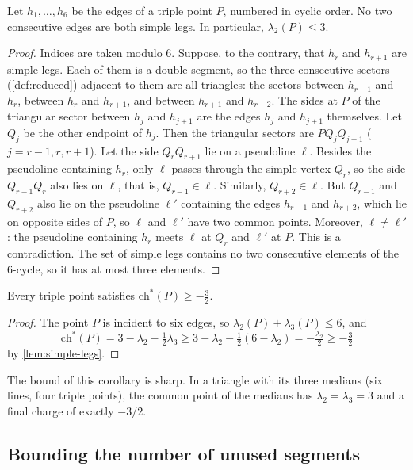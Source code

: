 \begin{lemma}\label{lem:simple-legs}
Let $h_1,\dots,h_6$ be the edges of a triple point $P$, numbered in cyclic order. No two consecutive edges are both simple legs. In particular, $\lambda_2(P)\le3$.
\end{lemma}

\begin{proof}
Indices are taken modulo 6.
Suppose, to the contrary, that $h_r$ and $h_{r+1}$ are simple legs.
Each of them is a double segment, so the three consecutive sectors (\cref{def:reduced}) adjacent to them are all triangles: the sectors between $h_{r-1}$ and $h_r$, between $h_r$ and $h_{r+1}$, and between $h_{r+1}$ and $h_{r+2}$.
The sides at $P$ of the triangular sector between $h_j$ and $h_{j+1}$ are the edges $h_j$ and $h_{j+1}$ themselves.
Let $Q_j$ be the other endpoint of $h_j$. Then the triangular sectors are $PQ_jQ_{j+1}$ ($j=r-1,r,r+1$).
Let the side $Q_rQ_{r+1}$ lie on a pseudoline $\ell$.
Besides the pseudoline containing $h_r$, only $\ell$ passes through the simple vertex $Q_r$, so the side $Q_{r-1}Q_r$ also lies on $\ell$, that is, $Q_{r-1}\in\ell$.
Similarly, $Q_{r+2}\in\ell$.
But $Q_{r-1}$ and $Q_{r+2}$ also lie on the pseudoline $\ell'$ containing the edges $h_{r-1}$ and $h_{r+2}$, which lie on opposite sides of $P$, so $\ell$ and $\ell'$ have two common points.
Moreover, $\ell\ne\ell'$: the pseudoline containing $h_r$ meets $\ell$ at $Q_r$ and $\ell'$ at $P$. This is a contradiction.
The set of simple legs contains no two consecutive elements of the 6-cycle, so it has at most three elements.
\end{proof}

\begin{corollary}\label{cor:charge-triple}
Every triple point satisfies $\mathrm{ch}^*(P)\ge-\tfrac32$.
\end{corollary}

\begin{proof}
The point $P$ is incident to six edges, so $\lambda_2(P)+\lambda_3(P)\le6$, and
\[
\mathrm{ch}^*(P)=3-\lambda_2-\tfrac12\lambda_3\ge3-\lambda_2-\tfrac12(6-\lambda_2)=-\tfrac{\lambda_2}2\ge-\tfrac32
\]
by \cref{lem:simple-legs}.
\end{proof}

The bound of this corollary is sharp. In a triangle with its three medians (six lines, four triple points), the common point of the medians has $\lambda_2=\lambda_3=3$ and a final charge of exactly $-3/2$.

\subsection{Bounding the number of unused segments}

